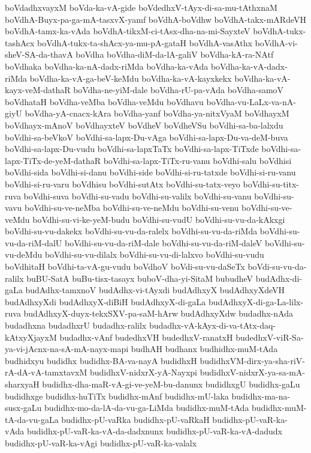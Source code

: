 {boVdadhxvayxM
boVda-ka-vA-gide
boVdedhxV-tAyx-di-sa-mu-tAthxnaM
boVdhA-Buyx-pa-ga-mA-tasxvX-yamf
boVdhA-boVdhw
boVdhA-takx-mARdeVH
boVdhA-tamx-ka-vAda
boVdhA-tikxM-ci-tAsx-dha-na-mi-SayxteV
boVdhA-tukx-tashAcx
boVdhA-tukx-ta-shAcx-ya-mu-pA-gataH
boVdhA-vasAthx
boVdhA-vi-sheV-SA-da-thavA
boVdha
boVdha-diM-da-lA-galiV
boVdha-kA-ra-NAtf
boVdhaka
boVdha-ka-nA-dadx-riMda
boVdha-ka-vAda
boVdha-ka-vA-dadx-riMda
boVdha-ka-vA-ga-beV-keMdu
boVdha-ka-vA-kayxkekx
boVdha-ka-vA-kayx-veM-dathaR
boVdha-ne-yiM-dale
boVdha-rU-pa-vAda
boVdha-samoV
boVdhataH
boVdha-veMba
boVdha-veMdu
boVdhavu
boVdha-vu-LaLx-va-nA-giyU
boVdha-yA-cnacx-kAra
boVdha-yanf
boVdha-ya-nitxVyaM
boVdhayxM
boVdhayx-mAnoV
boVdhayxteV
boVdheV
boVdheVSu
boVdhi-sa-ba-lalxdu
boVdhi-sa-beVkoV
boVdhi-sa-lapx-Du-vAga
boVdhi-sa-lapx-Du-va-deM-buva
boVdhi-sa-lapx-Du-vudu
boVdhi-sa-lapxTaTx
boVdhi-sa-lapx-TiTxde
boVdhi-sa-lapx-TiTx-de-yeM-dathaR
boVdhi-sa-lapx-TiTx-ru-vanu
boVdhi-salu
boVdhisi
boVdhi-sida
boVdhi-si-danu
boVdhi-side
boVdhi-si-ru-tatxde
boVdhi-si-ru-vanu
boVdhi-si-ru-varu
boVdhisu
boVdhi-sutAtx
boVdhi-su-tatx-veyo
boVdhi-su-titx-ruva
boVdhi-suva
boVdhi-su-vadu
boVdhi-su-valilx
boVdhi-su-vanu
boVdhi-su-vavu
boVdhi-su-ve-neMba
boVdhi-su-ve-neMdu
boVdhi-su-venu
boVdhi-su-ve-veMdu
boVdhi-su-vi-ke-yeM-budu
boVdhi-su-vudU
boVdhi-su-vu-da-kAkxgi
boVdhi-su-vu-dakekx
boVdhi-su-vu-da-ralelx
boVdhi-su-vu-da-riMda
boVdhi-su-vu-da-riM-dalU
boVdhi-su-vu-da-riM-dale
boVdhi-su-vu-da-riM-daleV
boVdhi-su-vu-deMdu
boVdhi-su-vu-dilalx
boVdhi-su-vu-di-lalxvo
boVdhi-su-vudu
boVdhitaH
boVdhi-ta-vA-gu-vudu
boVdhoV
boVdi-su-vu-daSeTx
boVdi-su-vu-da-ralilx
buBU-SatA
buBu-tisx-tasayx
buboV-dha-yi-SitaM
bubudheV
budAdhx-di-gaLa
budAdhx-tamxnoV
budAdhx-vi-tAyxdi
budAdhxyX
budAdhxyXdeVH
budAdhxyXdi
budAdhxyX-diBiH
budAdhxyX-di-gaLa
budAdhxyX-di-ga-La-lilx-ruva
budAdhxyX-duyx-tekxSXV-pa-saM-hArw
budAdhxyXdw
budadhx-nAda
budadhxna
budadhxrU
budadhx-ralilx
budadhx-vA-kAyx-di-va-tAtx-daq-kAtxyXjayxM
budadhx-vAnf
budedhxVH
budedhxV-ranatxH
budedhxV-viR-Sa-ya-vi-jAcnx-na-sA-mA-nayx-mapi
budhAH
budhanx
budhidhx-muM-tAda
budhidxyu
budidhx
budidhx-BA-va-nayA
budidhxH
budidhxVM-dirx-ya-sha-riV-rA-dA-vA-tamxtavxM
budidhxV-nidxrX-yA-Nayxpi
budidhxV-nidxrX-ya-sa-mA-sharxyaH
budidhx-dha-maR-vA-gi-ve-yeM-bu-danunx
budidhxgU
budidhx-gaLu
budidhxge
budidhx-huTiTx
budidhx-mAnf
budidhx-mU-laka
budidhx-ma-na-susx-gaLu
budidhx-mo-da-lA-da-vu-ga-LiMda
budidhx-muM-tAda
budidhx-muM-tA-da-vu-gaLa
budidhx-pU-vaRka
budidhx-pU-vaRkaH
budidhx-pU-vaR-ka-vAda
budidhx-pU-vaR-ka-vA-da-dadxnunx
budidhx-pU-vaR-ka-vA-dadudx
budidhx-pU-vaR-ka-vAgi
budidhx-pU-vaR-ka-valalx
}
